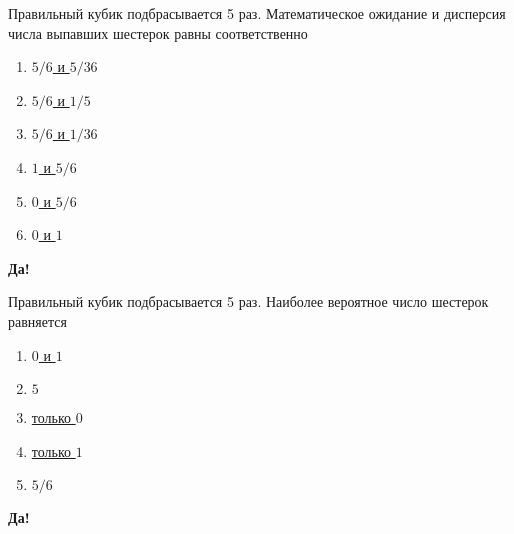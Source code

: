 \documentclass[t]{beamer}
\begin{document}
 \begin{frame} \label{23-Yes} 
\begin{block}{23} 

Правильный кубик подбрасывается 5 раз. Математическое ожидание и дисперсия числа выпавших шестерок равны соответственно
  


 \end{block} 
\begin{enumerate} 
\item[] \hyperlink{23-No}{\beamergotobutton{} $5/6$ и $5/36$}
\item[] \hyperlink{23-No}{\beamergotobutton{} $5/6$ и $1/5$}
\item[] \hyperlink{23-No}{\beamergotobutton{} $5/6$ и $1/36$}
\item[] \hyperlink{23-No}{\beamergotobutton{} $1$ и $5/6$}
\item[] \hyperlink{23-No}{\beamergotobutton{} $0$ и $5/6$}
\item[] \hyperlink{23-No}{\beamergotobutton{} $0$ и $1$}
\end{enumerate} 

 \textbf{Да!} 
 \hyperlink{24}{}\end{frame} 


 \begin{frame} \label{24-Yes} 
\begin{block}{24} 

  Правильный кубик подбрасывается 5 раз. Наиболее вероятное число шестерок равняется
  


 \end{block} 
\begin{enumerate} 
\item[] \hyperlink{24-Yes}{\beamergotobutton{} $0$ и $1$}
\item[] \hyperlink{24-No}{\beamergotobutton{} $5$}
\item[] \hyperlink{24-No}{\beamergotobutton{} только $0$}
\item[] \hyperlink{24-No}{\beamergotobutton{} только $1$}
\item[] \hyperlink{24-No}{\beamergotobutton{} $5/6$}
\end{enumerate} 

 \textbf{Да!} 
 \hyperlink{25}{}\end{frame} 
\end{document}
